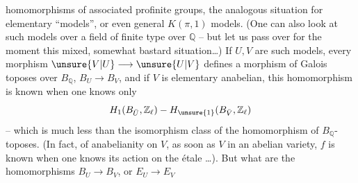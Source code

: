 homomorphisms of associated profinite groups,   the analogous situation for elementary ``models'', or even general $K(\pi,1)$ models. (One can also look at such models over a  field  of finite type over $\mathbb{Q}$ -- but let us pass over for the moment this mixed, somewhat bastard situation\ldots) If $U,V$ are such models, every morphism $\unsure{V|U}\longrightarrow\unsure{U|V}$ defines a morphism of Galois toposes over $B_{\mathbb{Q}}$, $B_U\longrightarrow B_V$,  and if $V$ is  elementary anabelian, this homomorphism is known when one knows only
\[
H_1(B_{\bar U},\mathbb{Z}_{\ell})-H_{\unsure{1}}(B_{\bar V},\mathbb{Z}_{\ell})
\]
-- which is much less than the isomorphism class of the homomorphism of $B_{\mathbb{Q}}$-toposes. (In fact,   of anabelianity on $V$, as soon as $V$  in an abelian variety, $f$ is known when one knows its action on the étale \ldots). But what are the homomorphisms $B_U\longrightarrow B_V$, or $E_U\longrightarrow E_V$
